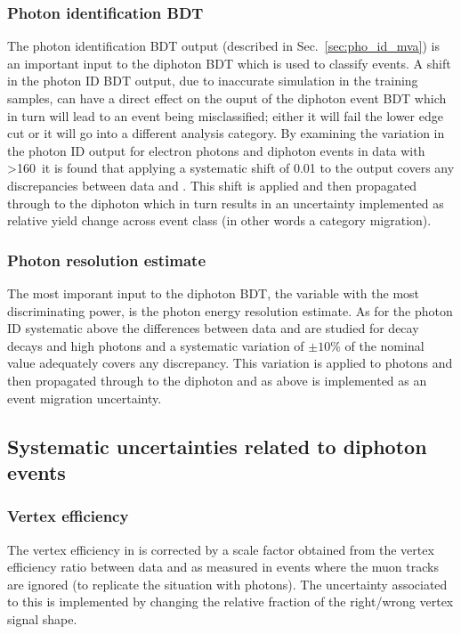 \subsubsection{Photon identification BDT}

The photon identification BDT output (described in Sec.~\ref{sec:pho_id_mva}) is an important input to the diphoton BDT which is used to classify events. A shift in the photon ID BDT output, due to inaccurate simulation in the training samples, can have a direct effect on the ouput of the diphoton event BDT which in turn will lead to an event being misclassified; either it will fail the lower edge cut or it will go into a different analysis category. By examining the variation in the photon ID output for \Zee electron \Zmumugamma photons and diphoton events in data with \mgg>160~\GeV it is found that applying a systematic shift of 0.01 to the output covers any discrepancies between data and \MC. This shift is applied and then propagated through to the diphoton \BDT which in turn results in an uncertainty implemented as relative yield change across event class (in other words a category migration).

\subsubsection{Photon resolution estimate}

The most imporant input to the diphoton BDT, the variable with the most discriminating power, is the photon energy resolution estimate. As for the photon ID systematic above the differences between data and \MC are studied for \Zee decay \Zmumugamma decays and high \pT photons and a systematic variation of $\pm10$\% of the nominal value adequately covers any discrepancy. This variation is applied to photons and then propagated through to the diphoton \BDT and as above is implemented as an event migration uncertainty.

\subsection{Systematic uncertainties related to diphoton events}

\subsubsection{Vertex efficiency}

The vertex efficiency in \MC is corrected by a scale factor obtained from the vertex efficiency ratio between data and \MC as measured in \Zmumu events where the muon tracks are ignored (to replicate the situation with photons). The uncertainty associated to this is implemented by changing the relative fraction of the right/wrong vertex signal shape. 

